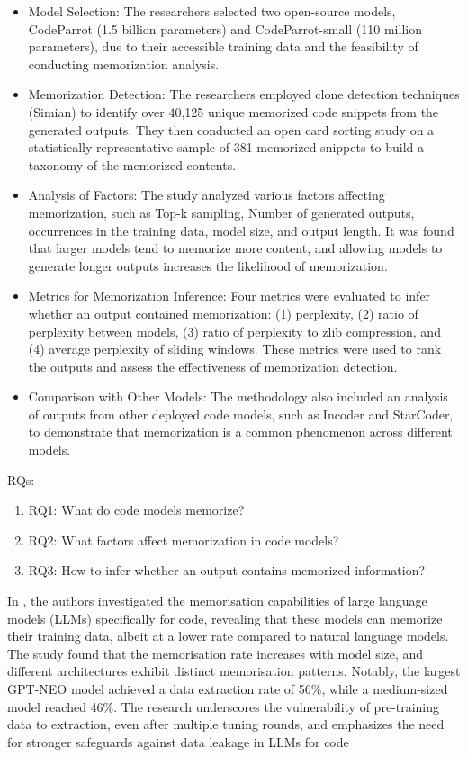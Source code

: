 \begin{tcolorbox}[title=Approach, colback=white, colframe=black, sharp corners=southwest, boxrule=0.8mm]
\begin{itemize}
    \item Model Selection: The researchers selected two open-source models, CodeParrot (1.5 billion parameters) and CodeParrot-small (110 million parameters), due to their accessible training data and the feasibility of conducting memorization analysis.
\item Memorization Detection: The researchers employed clone detection techniques (Simian) to identify over 40,125 unique memorized code snippets from the generated outputs. They then conducted an open card sorting study on a statistically representative sample of 381 memorized snippets to build a taxonomy of the memorized contents.
\item Analysis of Factors: The study analyzed various factors affecting memorization, such as Top-k sampling, Number of generated outputs, occurrences in the training data, model size, and output length. It was found that larger models tend to memorize more content, and allowing models to generate longer outputs increases the likelihood of memorization.
\item Metrics for Memorization Inference: Four metrics were evaluated to infer whether an output contained memorization: (1) perplexity, (2) ratio of perplexity between models, (3) ratio of perplexity to zlib compression, and (4) average perplexity of sliding windows. These metrics were used to rank the outputs and assess the effectiveness of memorization detection.
\item Comparison with Other Models: The methodology also included an analysis of outputs from other deployed code models, such as Incoder and StarCoder, to demonstrate that memorization is a common phenomenon across different models.
\end{itemize}
RQs:
\begin{enumerate}
    \item RQ1: What do code models memorize?
    \item RQ2: What factors affect memorization in code models?
    \item RQ3: How to infer whether an output contains memorized information?
\end{enumerate}
\end{tcolorbox}


In \cite{AlKaswan:TracesMemorisation:ICSE:2024}, the authors investigated the memorisation capabilities of large language models (LLMs) specifically for code, revealing that these models can memorize their training data, albeit at a lower rate compared to natural language models. The study found that the memorisation rate increases with model size, and different architectures exhibit distinct memorisation patterns. Notably, the largest GPT-NEO model achieved a data extraction rate of 56\%, while a medium-sized model reached 46\%. The research underscores the vulnerability of pre-training data to extraction, even after multiple tuning rounds, and emphasizes the need for stronger safeguards against data leakage in LLMs for code

